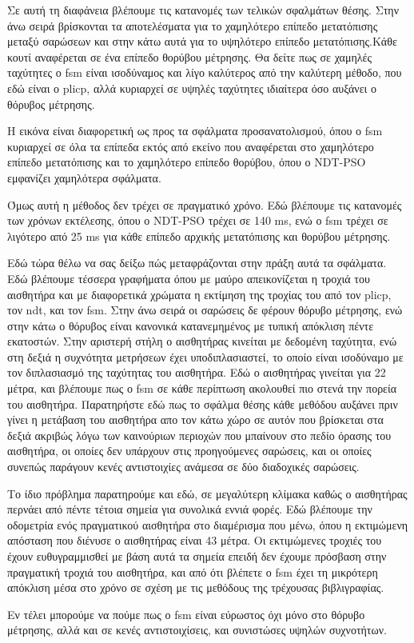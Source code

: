\documentclass[a4paper,10pt]{article}
\begin{document}
Σε αυτή τη διαφάνεια βλέπουμε τις κατανομές των τελικών σφαλμάτων θέσης. Στην
άνω σειρά βρίσκονται τα αποτελέσματα για το χαμηλότερο επίπεδο μετατόπισης
μεταξύ σαρώσεων και στην κάτω αυτά για το υψηλότερο επίπεδο μετατόπισης.Κάθε
κουτί αναφέρεται σε ένα επίπεδο θορύβου μέτρησης. Θα δείτε πως σε χαμηλές
ταχύτητες ο fsm είναι ισοδύναμος και λίγο καλύτερος από την καλύτερη μέθοδο,
που εδώ είναι ο plicp, αλλά κυριαρχεί σε υψηλές ταχύτητες ιδιαίτερα όσο αυξάνει
ο θόρυβος μέτρησης.

Η εικόνα είναι διαφορετική ως προς τα σφάλματα προσανατολισμού, όπου ο fsm
κυριαρχεί σε όλα τα επίπεδα εκτός από εκείνο που αναφέρεται στο χαμηλότερο
επίπεδο μετατόπισης και το χαμηλότερο επίπεδο θορύβου, όπου ο NDT-PSO εμφανίζει
χαμηλότερα σφάλματα.

Όμως αυτή η μέθοδος δεν τρέχει σε πραγματικό χρόνο. Εδώ βλέπουμε τις κατανομές
των χρόνων εκτέλεσης, όπου ο NDT-PSO τρέχει σε 140 ms, ενώ ο fsm τρέχει σε
λιγότερο από 25 ms για κάθε επίπεδο αρχικής μετατόπισης και θορύβου μέτρησης.

Εδώ τώρα θέλω να σας δείξω πώς μεταφράζονται στην πράξη αυτά τα σφάλματα. Εδώ
βλέπουμε τέσσερα γραφήματα όπου με μαύρο απεικονίζεται η τροχιά του αισθητήρα
και με διαφορετικά χρώματα η εκτίμηση της τροχίας του από τον plicp, τον ndt,
και τον fsm. Στην άνω σειρά οι σαρώσεις δε φέρουν θόρυβο μέτρησης, ενώ στην
κάτω ο θόρυβος είναι κανονικά κατανεμημένος με τυπική απόκλιση πέντε εκατοστών.
Στην αριστερή στήλη ο αισθητήρας κινείται με δεδομένη ταχύτητα, ενώ στη δεξιά η
συχνότητα μετρήσεων έχει υποδιπλασιαστεί, το οποίο είναι ισοδύναμο με τον
διπλασιασμό της ταχύτητας του αισθητήρα. Εδώ ο αισθητήρας γινείται για 22
μέτρα, και βλέπουμε πως ο fsm σε κάθε περίπτωση ακολουθεί πιο στενά την πορεία
του αισθητήρα. Παρατηρήστε εδώ πως το σφάλμα θέσης κάθε μεθόδου αυξάνει πριν
γίνει η μετάβαση του αισθητήρα απο τον κάτω χώρο σε αυτόν που βρίσκεται στα
δεξιά ακριβώς λόγω των καινούριων περιοχών που μπαίνουν στο πεδίο όρασης του
αισθητήρα, οι οποίες δεν υπάρχουν στις προηγούμενες σαρώσεις, και οι οποίες
συνεπώς παράγουν κενές αντιστοιχίες ανάμεσα σε δύο διαδοχικές σαρώσεις.

Το ίδιο πρόβλημα παρατηρούμε και εδώ, σε μεγαλύτερη κλίμακα καθώς ο αισθητήρας
περνάει από πέντε τέτοια σημεία για συνολικά εννιά φορές. Εδώ βλέπουμε την
οδομετρία ενός πραγματικού αισθητήρα στο διαμέρισμα που μένω, όπου η εκτιμώμενη
απόσταση που διένυσε ο αισθητήρας είναι 43 μέτρα. Οι εκτιμώμενες τροχιές του
έχουν ευθυγραμμισθεί με βάση αυτά τα σημεία επειδή δεν έχουμε πρόσβαση στην
πραγματική τροχιά του αισθητήρα, και από ότι βλέπετε ο fsm έχει τη μικρότερη
απόκλιση μέσα στο χρόνο σε σχέση με τις μεθόδους της τρέχουσας βιβλιγραφίας.

Εν τέλει μπορούμε να πούμε πως ο fsm είναι εύρωστος όχι μόνο στο θόρυβο
μέτρησης, αλλά και σε κενές αντιστοιχίσεις, και συνιστώσες υψηλών συχνοτήτων.
\end{document}

